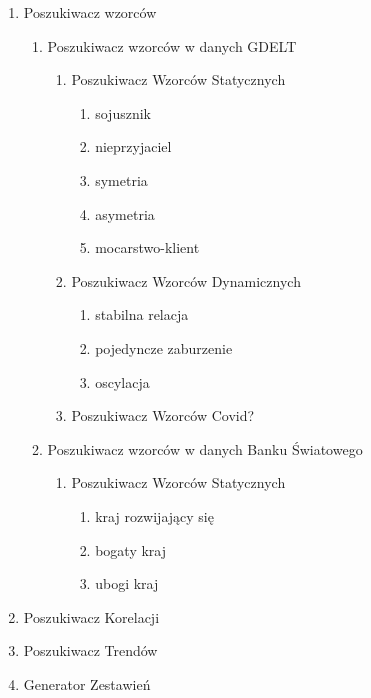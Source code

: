 \documentclass[11pt]{report}
\begin{document}
    \begin{enumerate}
        \item Poszukiwacz wzorców
        \begin{enumerate}
            \item Poszukiwacz wzorców w danych GDELT
            \begin{enumerate}
                \item Poszukiwacz Wzorców Statycznych
                \begin{enumerate}
                    \item sojusznik
                    \item nieprzyjaciel
                    \item symetria
                    \item asymetria
                    \item mocarstwo-klient
                \end{enumerate}
                \item Poszukiwacz Wzorców Dynamicznych
                \begin{enumerate}
                    \item stabilna relacja
                    \item pojedyncze zaburzenie
                    \item oscylacja
                \end{enumerate}
                \item Poszukiwacz Wzorców Covid?
            \end{enumerate}
            \item Poszukiwacz wzorców w danych Banku Światowego
            \begin{enumerate}
                \item Poszukiwacz Wzorców Statycznych
                \begin{enumerate}
                    \item kraj rozwijający się
                    \item bogaty kraj
                    \item ubogi kraj
                \end{enumerate}
            \end{enumerate}
        \end{enumerate}
        \item Poszukiwacz Korelacji
        \item Poszukiwacz Trendów
        \item Generator Zestawień
    \end{enumerate}
\end{document}
